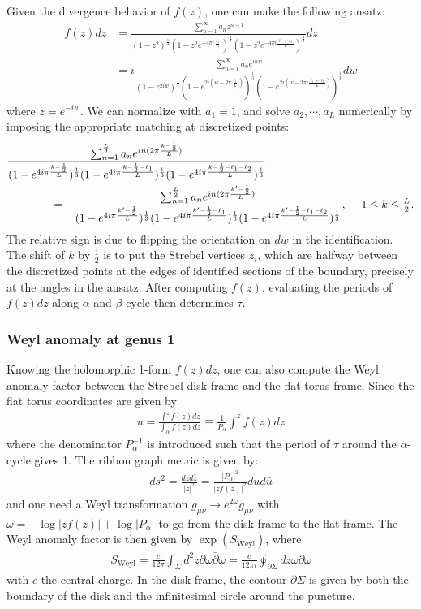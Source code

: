 \documentclass[12pt,letterpaper]{article}
\def\ie{\begin{equation}\begin{aligned}}
\def\fe{\end{aligned}\end{equation}}
\numberwithin{equation}{section}
\begin{document}
Given the divergence behavior of $f(z)$, one can make the following ansatz:
\ie\label{fzoneform}
f(z) dz &= \frac{\sum_{n=1}^\infty a_n z^{n-1}}{(1-z^2)^{\frac13} (1-z^2 e^{-4 \pi i \frac{\ell_1}{ L}})^{\frac13} (1-z^2 e^{-4 \pi i \frac{\ell_1 +\ell_2}{L}})^{\frac13}} dz\\
& = i  \frac{\sum_{n=1}^\infty a_n e^{inw} }{(1-e^{2iw})^{\frac13} (1- e^{2i(w-2 \pi \frac{\ell_1}{L})})^{\frac13} (1- e^{2i(w-2 \pi i \frac{\ell_1 +\ell_2}{L}) })^{\frac13}}  dw
\fe
where $z=e^{-iw}$. We can normalize with $a_1=1$, and solve $a_2,\cdots, a_L$ numerically by imposing the appropriate matching at discretized points:
\ie
{}&\frac{\sum_{n=1}^{L \over 2} a_n e^{in (2 \pi \frac{k-\frac 12}{L})} }{(1-e^{4i\pi \frac{k-\frac12}{L}})^{\frac13} (1- e^{4i \pi \frac{k-\frac12-\ell_1}{L} })^{\frac13} (1- e^{4i\pi \frac{k-\frac12-\ell_1 -\ell_2}{L} })^{\frac13}}\\
&\qquad\qquad = - \frac{\sum_{n=1}^{L \over 2} a_n e^{in (2 \pi \frac{k'-\frac 12}{L})} }{(1-e^{4i\pi \frac{k'-\frac12}{L}})^{\frac13} (1- e^{4i \pi \frac{k'-\frac12-\ell_1}{L} })^{\frac13} (1- e^{4i\pi \frac{k'-\frac12-\ell_1 -\ell_2}{L} })^{\frac13}}, ~~~~1 \leq k \leq \tfrac{L}{2}.
\fe
The relative sign is due to flipping the orientation on $dw$ in the identification. The shift of $k$ by $\frac12$ is to put the Strebel vertices $z_i$, which are halfway between the discretized points at the edges of identified sections of the boundary, precisely at the angles in the ansatz. After computing $f(z)$, evaluating the periods of $f(z) dz$ along $\alpha$ and $\beta$ cycle then determines $\tau$.

\subsubsection*{Weyl anomaly at genus 1}

Knowing the holomorphic 1-form $f(z)dz$, one can also compute the Weyl anomaly factor between the Strebel disk frame and the flat torus frame. Since the flat torus coordinates are given by
\ie
u=\frac{\int^z f(z)dz}{\int_\alpha f(z)dz} \equiv \frac{1}{P_\alpha}\int^z f(z)dz
\fe
where the denominator $P_\alpha^{-1}$ is introduced such that the period of $\tau$ around the $\alpha$-cycle gives 1. The ribbon graph metric is given by:
\ie
ds^2=\frac{dzd\bar{z}}{|z|^2} = \frac{|P_\alpha|^2}{|z f(z)|^2}dud\bar{u}
\fe
and one need a Weyl transformation $g_{\mu\nu}\rightarrow e^{2\omega} g_{\mu\nu}$ with $\omega = -\log |zf(z)|+\log |P_\alpha|$ to go from the disk frame to the flat frame. The Weyl anomaly factor is then given by $\exp(S_\text{Weyl})$, where 
\ie
S_\text{Weyl}=\frac{c}{12\pi}\int_{\Sigma} d^2z \partial \omega \bar{\partial}\omega = \frac{c}{12\pi i}\oint_{\partial \Sigma}dz \omega \partial \omega
\fe
with $c$ the central charge. In the disk frame, the contour $\partial \Sigma$ is given by both the boundary of the disk and the infinitesimal circle around the puncture. 
\end{document}
